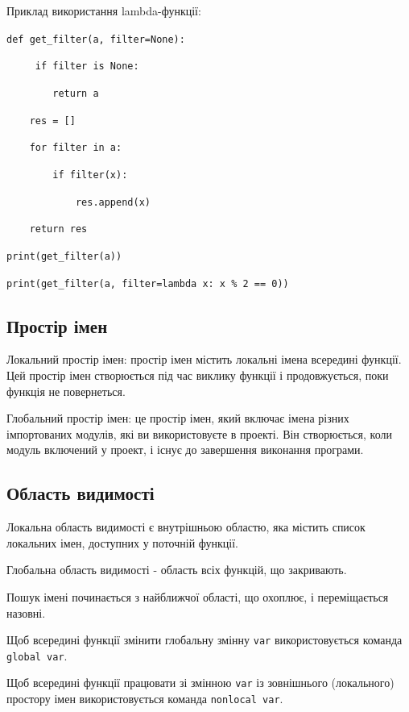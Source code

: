 \begin{frame}
Приклад використання lambda-функції:

\texttt{def get\_filter(a, filter=None):}

\texttt{~~~~ if filter is None:}

\texttt{~~~~~~~~return a}

\texttt{~~~~res = []}

\texttt{~~~~for filter in a:}

\texttt{~~~~~~~~if filter(x):}

\texttt{~~~~~~~~~~~~res.append(x)}

\texttt{~~~~return res}

\vspace*{0.8cm}

\texttt{print(get\_filter(a))}

\texttt{print(get\_filter(a, filter=lambda x: x \% 2 == 0))}
\end{frame}

\subsection{Простір імен} 
\begin{frame}
Локальний простір імен: простір імен містить локальні імена всередині функції. Цей простір імен створюється під час виклику функції і продовжується, поки функція не повернеться.

Глобальний простір імен: це простір імен, який включає імена різних імпортованих модулів, які ви використовуєте в проекті. Він створюється, коли модуль включений у проект, і існує до завершення виконання програми.

\end{frame}

\subsection{Область видимості} 
\begin{frame}
Локальна область видимості є внутрішньою областю, яка містить список локальних імен, доступних у поточній функції.

Глобальна область  видимості - область всіх функцій, що закривають. 

Пошук імені починається з найближчої області, що охоплює, і переміщається назовні.

Щоб всередині функції змінити глобальну змінну \texttt{var} використовується команда \texttt{global var}.

Щоб всередині функції працювати зі змінною \texttt{var} із зовнішнього (локального) простору імен використовується команда \texttt{nonlocal var}.

\end{frame}

